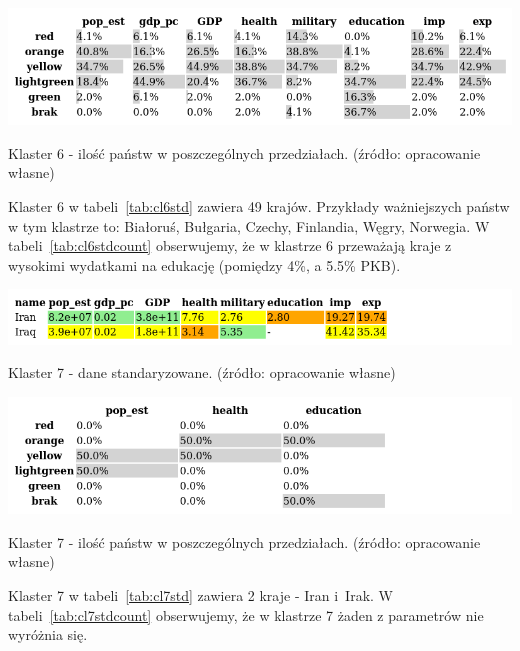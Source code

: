 \documentclass[11pt]{report}
\begin{document}
    \begin{table}[!htp]
        \centering
        \includegraphics[width=\linewidth]{tables/CLUST/cluster6stdkmeanscount.png}
        \caption{Klaster 6 - ilość państw w poszczególnych przedziałach. (źródło: opracowanie własne)}
        \label{tab:cl6stdcount}
    \end{table}

    Klaster 6 w tabeli~\ref{tab:cl6std} zawiera 49 krajów.
    Przykłady ważniejszych państw w tym klastrze to: Białoruś, Bułgaria, Czechy, Finlandia, Węgry, Norwegia.
    W tabeli~\ref{tab:cl6stdcount} obserwujemy, że w klastrze 6 przeważają kraje z wysokimi wydatkami na edukację (pomiędzy 4\%, a 5.5\% PKB).

    \begin{table}[!htp]
        \centering
        \includegraphics[width=\linewidth]{tables/CLUST/cluster7stdkmeans.png}
        \caption{Klaster 7 - dane standaryzowane. (źródło: opracowanie własne)}
        \label{tab:cl7std}
    \end{table}

    \begin{table}[!htp]
        \centering
        \includegraphics[width=\linewidth]{tables/CLUST/cluster7stdkmeanscount.png}
        \caption{Klaster 7 - ilość państw w poszczególnych przedziałach. (źródło: opracowanie własne)}
        \label{tab:cl7stdcount}
    \end{table}

    Klaster 7 w tabeli~\ref{tab:cl7std} zawiera 2 kraje - Iran i~Irak.
    W tabeli~\ref{tab:cl7stdcount} obserwujemy, że w klastrze 7 żaden z parametrów nie wyróżnia się.
\end{document}
